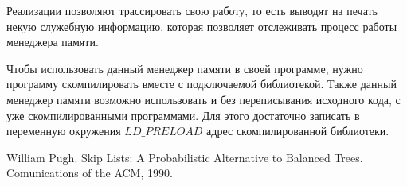 Реализации позволяют трассировать свою работу, то есть выводят на печать некую 
служебную информацию, которая позволяет отслеживать процесс работы менеджера памяти.

Чтобы использовать данный менеджер памяти в своей программе, нужно программу скомпилировать вместе
с подключаемой библиотекой. 
Также данный менеджер памяти возможно использовать и без переписывания исходного кода,
с уже скомпилированными программами.  Для этого достаточно записать в переменную
окружения $LD\_PRELOAD$ адрес скомпилированной библиотеки.

\begin{thebibliography}{99}
William Pugh. Skip Lists: A Probabilistic Alternative to Balanced Trees. Comunications of the ACM, 1990.
\end{thebibliography}
